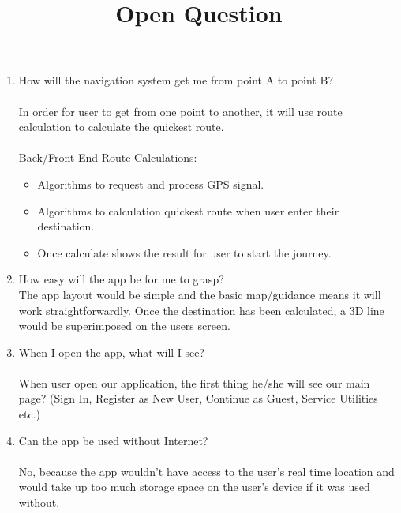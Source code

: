 \documentclass{article}
\title{Open Question}
\begin{document}
\begin{enumerate}
    \item How will the navigation system get me from point A to point B?\\\\
    In order for user to get from one point to another, it will use route calculation to calculate the quickest route.\\\\
    Back/Front-End Route Calculations:
    \begin{itemize}
        \item Algorithms to request and process GPS signal.
        \item Algorithms to calculation quickest route when user enter their destination.
        \item Once calculate shows the result for user to start the journey.
    \end{itemize}
    
    \item How easy will the app be for me to grasp? \\
    
    The app layout would be simple and the basic map/guidance means it will work straightforwardly. Once the destination has been calculated, a 3D line would be superimposed on the users screen.
    
    \item When I open the app, what will I see?\\\\
    When user open our application, the first thing he/she will see our main page? (Sign In, Register as New User, Continue as Guest, Service Utilities etc.)
    
    \item Can the app be used without Internet?\\\\
    No, because the app wouldn't have access to the user's real time location and would take up too much storage space on the user's device if it was used without.
\end{enumerate}
\end{document}
